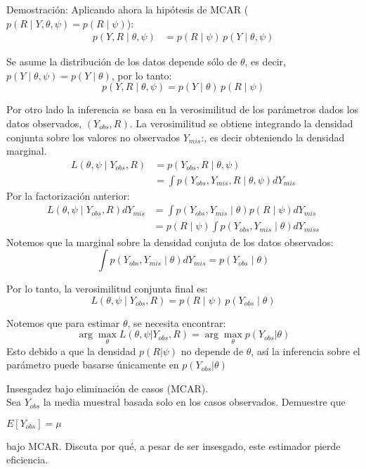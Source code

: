 \documentclass[a4paper,11pt]{article}
\begin{document}
\begin{demostracion}{Demostración:}
Aplicando ahora la hipótesis de MCAR ($p(R \mid Y, \theta, \psi) = p(R \mid \psi)$):
\begin{align*}
    p(Y, R \mid \theta, \psi) &= p(R \mid \psi) \, p(Y \mid \theta, \psi)
\end{align*}

Se asume la distribución de los datos depende sólo de $\theta$, es decir, $p(Y \mid \theta, \psi) = p(Y \mid \theta)$, por lo tanto:
\[
p(Y, R \mid \theta, \psi) = p(Y \mid \theta) \, p(R \mid \psi)
\]

Por otro lado la inferencia se basa en la verosimilitud de los parámetros dados los datos observados, $(Y_{obs}, R)$. La verosimilitud se obtiene integrando la densidad conjunta sobre los valores no observados $Y_{mis}$:, es decir obteniendo la densidad marginal.
\begin{align*}
    L(\theta, \psi \mid Y_{obs}, R) &= p(Y_{obs}, R \mid \theta, \psi) \\
 &= \int p(Y_{obs}, Y_{mis}, R \mid \theta, \psi)  dY_{mis}
\end{align*}
Por la factorización anterior:
\begin{align*}
    L(\theta, \psi \mid Y_{obs}, R)   dY_{mis}&= \int p(Y_{obs}, Y_{mis} \mid \theta) p(R \mid \psi)  dY_{mis}\\
    &= p(R \mid \psi) \int p(Y_{obs}, Y_{mis} \mid \theta)dY_{miss}
\end{align*}
Notemos que la marginal sobre la densidad conjuta de los datos observados:
\[
\int p(Y_{obs}, Y_{mis} \mid \theta)  dY_{mis} = p(Y_{obs} \mid \theta)
\]

Por lo tanto, la verosimilitud conjunta final es:
\[
L(\theta, \psi \mid Y_{obs}, R) = p(R \mid \psi) \, p(Y_{obs} \mid \theta)
\]

Notemos que para estimar $\theta$, se necesita encontrar:
\[
\arg \max_\theta{L(\theta,\psi| Y_{obs},R )}=
\arg \max_\theta{p( Y_{obs}|\theta )}
\]
Esto debido a que la densidad $p(R|\psi)$ no depende de $\theta$, así la inferencia sobre el parámetro puede basarse únicamente en $p(Y_{obs}|\theta )$
\end{demostracion}
\newpage
\begin{ejercicio}{5}
Insesgadez bajo eliminación de casos (MCAR).\\
Sea $Y_{obs}$ la media muestral basada solo en los casos observados. Demuestre que

$E[Y_{obs}] = \mu$

bajo MCAR. Discuta por qué, a pesar de ser insesgado, este estimador pierde eficiencia.
\end{ejercicio}
\end{document}
